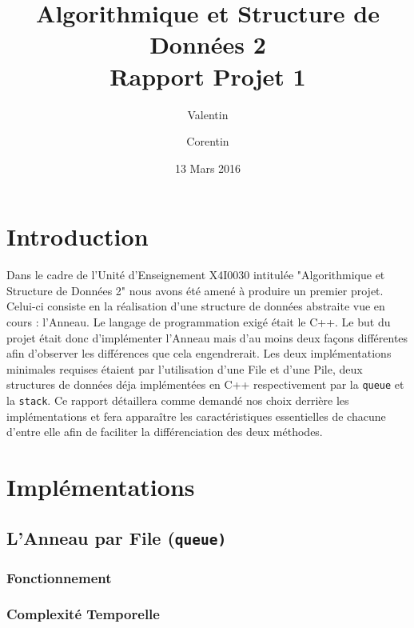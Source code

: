 \documentclass{article}
\title{Algorithmique et Structure de Données 2\\
Rapport Projet 1}
\author{Valentin \bsc{Hénique} \and Corentin \bsc{Chédotal}}
\date{13 Mars 2016}
\newcommand{\info}{\texttt}
\begin{document}
\maketitle

\section{Introduction}

Dans le cadre de l'Unité d'Enseignement X4I0030 intitulée "Algorithmique et Structure de Données 2" nous avons été amené à produire un premier projet. Celui-ci consiste en la réalisation d'une structure de données abstraite vue en cours : l'Anneau. Le langage de programmation exigé était le C++. Le but du projet était donc d'implémenter l'Anneau mais d'au moins deux façons différentes afin d'observer les différences que cela engendrerait. Les deux implémentations minimales requises étaient par l'utilisation d'une File et d'une Pile, deux structures de données déja implémentées en C++ respectivement par la \info{queue} et la \info{stack}. Ce rapport détaillera comme demandé nos choix derrière les implémentations et fera apparaître les caractéristiques essentielles de chacune d'entre elle afin de faciliter la différenciation des deux méthodes.

\section{Implémentations}

    \subsection{L'Anneau par File (\info{queue)}}
    
        \subsubsection{Fonctionnement}
        
        \subsubsection{Complexité Temporelle}
        
\end{document}
